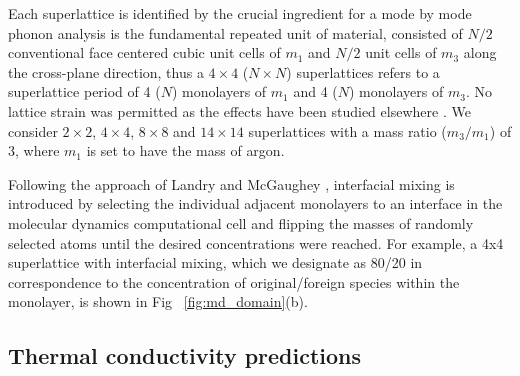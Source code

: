 \documentclass[aps,prb,preprint,preprintnumbers,amsmath,amssymb,floatfix,superscriptaddress]{revtex4}
\begin{document}
Each superlattice is identified by the crucial ingredient for a mode by mode phonon analysis is the fundamental repeated unit of material, consisted of $N/2$ conventional face centered cubic unit cells of $m_1$ and $N/2$ unit cells of $m_3$ along the cross-plane direction, thus a $4\times4$ ($N\times N$) superlattices refers to a superlattice period of 4 ($N$) monolayers of $m_1$ and 4 ($N$) monolayers of $m_3$. No lattice strain was permitted as the effects have been studied elsewhere \cite{PhysRevB.72.174302}.  We consider $2\times2$, $4\times4$, $8\times8$ and $14\times14$ superlattices with a mass ratio ($m_3/m_1$) of 3, where $m_1$ is set to have the mass of argon.
\begin{figure*}[ht!]
\begin{center}
\renewcommand{\figure}{Fig.}
\caption{Atomic representation of a $4\times4$ superlattice for unmixed (top) and 80/20 interfacial mixing (bottom) cases. Green is corresponds to $m_1$ and gray corresponds to $m_3$}
\label{fig:md_domain}
\end{center}
\end{figure*}

Following the approach of Landry and McGaughey \cite{PhysRevB.79.075316}, interfacial mixing is introduced by selecting the individual adjacent monolayers to an interface in the molecular dynamics computational cell and flipping the masses of randomly selected atoms until the desired concentrations were reached. For example, a 4x4 superlattice with interfacial mixing, which we designate as 80/20 in correspondence to the concentration of original/foreign species within the monolayer, is shown in Fig ~\ref{fig:md_domain}(b).

\subsection{Thermal conductivity predictions}
\end{document}
